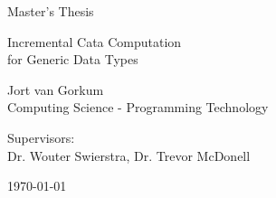\begin{titlepage}
    \fontsize{12pt}{15pt}\selectfont
    \begin{center}
      \vspace*{4cm}
  
      Master's Thesis
  
      \vspace{0.5cm}
  
      {
        \fontsize{20.74pt}{20.74pt}\selectfont
        \parbox[]{13cm} {
          \centering
          Incremental Cata Computation \\ for Generic Data Types
        }
      }
        
      \vspace{1.25cm}
      
      Jort van Gorkum\\
      Computing Science - Programming Technology\\
      
      \vspace{1.25cm}
      
      Supervisors: \\
      Dr. Wouter Swierstra, Dr. Trevor McDonell\\
      
      \vspace{1cm}
  
      \today
    \end{center}
  \end{titlepage}